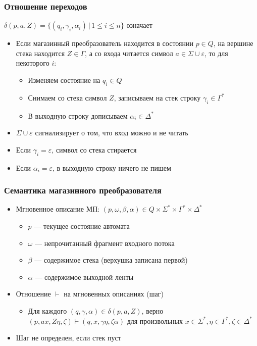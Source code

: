 \documentclass{beamer}
\begin{document}
\begin{frame}[fragile]
  \transwipe[direction=90]

\begin{center}
    \frametitle{Отношение переходов}
    $\delta(p, a, Z) = \{(q_i, \gamma_i, \alpha_i) \, | \, 1 \leq i \leq n \}$  означает
\end{center}

  \begin{itemize}
    \item Если магазинный преобразователь находится в состоянии $p \in Q$, на вершине стека находится $Z \in \Gamma$, а со входа читается символ $a \in \Sigma \cup \varepsilon$, то для некоторого $i$:
    \begin{itemize}
    	\item Изменяем состояние на $q_i \in Q$
    	\item Снимаем со стека символ $Z$, записываем на стек строку $\gamma_i \in \Gamma^*$
    	\item В выходную строку дописываем $\alpha_i \in \Delta^*$
    \end{itemize}
    \item $\Sigma \cup \varepsilon$ сигнализирует о том, что вход можно и не читать
    \item Если $\gamma_i = \varepsilon$, символ со стека стирается
    \item Если $\alpha_i = \varepsilon$, в выходную строку ничего не пишем
  \end{itemize}
\end{frame}

\begin{frame}[fragile]
  \transwipe[direction=90]
  \frametitle{Семантика магазинного преобразователя}
\begin{itemize}
  \item Мгновенное описание МП: $(p, \omega, \beta, \alpha) \in Q \times \Sigma^* \times \Gamma^* \times \Delta^*$
  \begin{itemize}
  	\item $p$ --- текущее состояние автомата
  	\item $\omega$ --- непрочитанный фрагмент входного потока
  	\item $\beta$ --- содержимое стека (верхушка записана первой)
  	\item $\alpha$ --- содержимое выходной ленты
  \end{itemize}
  \item Отношение $\vdash$ на мгновенных описаниях (шаг)
  \begin{itemize}
  	\item Для каждого $(q, \gamma, \alpha) \in \delta(p, a, Z)$, верно $(p, a x, Z \eta, \zeta) \vdash (q, x, \gamma \eta, \zeta  \alpha)$ для произвольных $x \in \Sigma^*, \eta \in \Gamma^*, \zeta \in \Delta^*$
  \end{itemize}
  \item Шаг не определен, если стек пуст
\end{itemize}

\end{frame}
\end{document}
